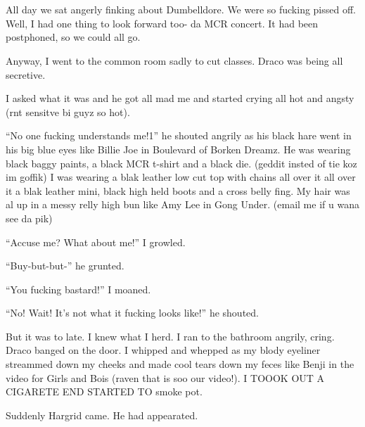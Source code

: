 \section[im nut ok i promise]{\protect{}}


\XXX{\Xfill 666\Xfill}

All day we sat angerly finking about Dumbelldore. We were so fucking pissed off. Well, I had one thing to look forward too- da MCR concert. It had been postphoned, so we could all go.

\begin{sloppypar}
    Anyway, I went to the common room sadly to cut classes. Draco was being all secretive.
\end{sloppypar}

I asked what it was and he got all mad me and started crying all hot and angsty (rnt sensitve bi guyz so hot).

\enquote{No one fucking understands me!1} he shouted angrily as his black hare went in his big blue eyes like Billie Joe in Boulevard of Borken Dreamz. He was wearing black baggy paints, a black MCR t-shirt and a black die. (geddit insted of tie koz im goffik) I was wearing a blak leather low cut top with chains all over it all over it a blak leather mini, black high held boots and a cross belly fing. My hair was al up in a messy relly high bun like Amy Lee in Gong Under. (email me if u wana see da pik)

\enquote{Accuse me? What about me!} I growled.

\enquote{Buy-but-but-} he grunted.

\enquote{You fucking bastard!} I moaned.

\enquote{No! Wait! It's not what it fucking looks like!} he shouted.

But it was to late. I knew what I herd. I ran to the bathroom angrily, cring. Draco banged on the door. I whipped and whepped as my blody eyeliner streammed down my cheeks and made cool tears down my feces like Benji in the video for Girls and Bois (raven that is soo our video!). I TOOOK OUT A CIGARETE END STARTED TO smoke pot.

Suddenly Hargrid came. He had appearated.


